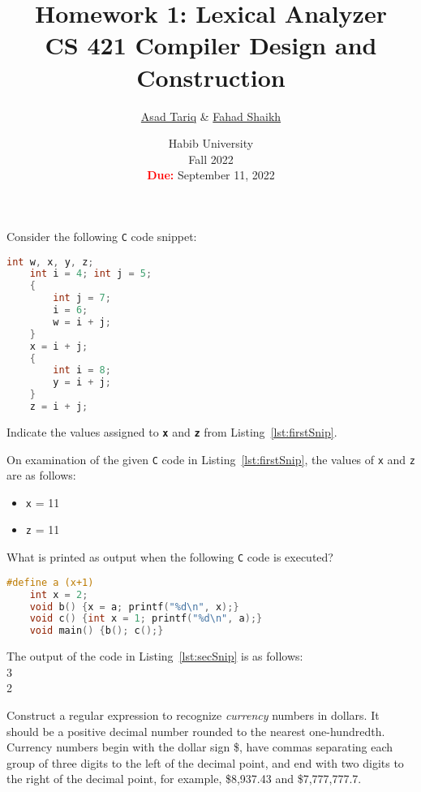 \documentclass[addpoints]{exam}
\title{Homework 1: Lexical Analyzer\\CS 421 Compiler Design and Construction}
\author{\href{mailto:at05439@st.habib.edu.pk}{Asad Tariq} \& \href{mailto:fs05452@st.habib.edu.pk}{Fahad Shaikh}}
\date{Habib University\\Fall 2022\\\textbf{\textcolor{red}{Due:}} September 11, 2022}
\begin{document}
\maketitle

\noindent

\begin{questions}

  \question[1]
  Consider the following \texttt{C} code snippet:
  \begin{lstlisting}[language=C, caption={\texttt{C} code snippet.}, label={lst:firstSnip}]
    int w, x, y, z;
    int i = 4; int j = 5;
    {
        int j = 7;
        i = 6;
        w = i + j;
    }
    x = i + j;
    {
        int i = 8;
        y = i + j;
    }
    z = i + j;
  \end{lstlisting}
  Indicate the values assigned to \textbf{\texttt{x}} and \textbf{\texttt{z}} from Listing~\ref{lst:firstSnip}.

  \begin{solution}
    On examination of the given \texttt{C} code in Listing~\ref{lst:firstSnip}, the values of \texttt{x} and \texttt{z} are as follows:
    \begin{itemize}
      \item \texttt{x} = 11
      \item \texttt{z} = 11
    \end{itemize}
  \end{solution}

  \question[1]
  What is printed as output when the following \texttt{C} code is executed?
  \begin{lstlisting}[language=C, caption={\texttt{C} code snippet.}, label={lst:secSnip}]
    #define a (x+1)
    int x = 2;
    void b() {x = a; printf("%d\n", x);}
    void c() {int x = 1; printf("%d\n", a);}
    void main() {b(); c();}
  \end{lstlisting}

  \begin{solution}
    The output of the code in Listing~\ref{lst:secSnip} is as follows:\\3\\2
  \end{solution}

  \question[1]
  Construct a regular expression to recognize \textit{currency} numbers in dollars.
  It should be a positive decimal number rounded to the nearest one-hundredth.
  Currency numbers begin with the dollar sign \$, have commas separating each group of three digits to the left of the decimal point, and end with two digits to the right of the decimal point, for example, \$8,937.43 and \$7,777,777.7.
  

\end{questions}
\end{document}
